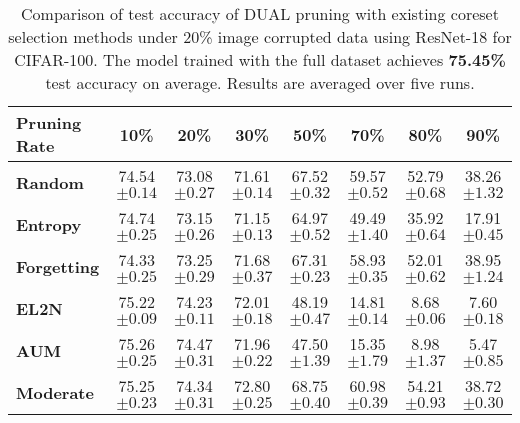 
\begin{table}[ht]
\caption{\label{tab:image_corruption_20_cifar}Comparison of test accuracy of DUAL pruning with existing coreset selection methods under 20\% image corrupted data using ResNet-18 for CIFAR-100. The model trained with the full dataset achieves \textbf{75.45\%} test accuracy on average. Results are averaged over five runs.}
\setlength{\tabcolsep}{3.1pt}
\centering
\begin{tabular}{lccccccc}
    \toprule
    \textbf{Pruning Rate} & \textbf{10\%} & \textbf{20\%} & \textbf{30\%} & \textbf{50\%} & \textbf{70\%} & \textbf{80\%} & \textbf{90\%} \\
    \midrule
    \textbf{Random} & 74.54 \scriptsize{$\pm 0.14$} & 73.08 \scriptsize{$\pm 0.27 $} & 71.61 \scriptsize{$\pm 0.14 $} & 67.52 \scriptsize{$\pm 0.32 $} & 59.57 \scriptsize{$\pm 0.52 $} & 52.79 \scriptsize{$\pm 0.68 $} & 38.26 \scriptsize{$\pm 1.32 $} \\
    
    \textbf{Entropy} & 74.74 \scriptsize{$\pm 0.25 $} & 73.15 \scriptsize{$\pm 0.26$} & 71.15 \scriptsize{$\pm 0.13 $} & 64.97 \scriptsize{$\pm 0.52 $} & 49.49 \scriptsize{$ \pm 1.40$} & 35.92 \scriptsize{$\pm 0.64 $} & 17.91 \scriptsize{$\pm 0.45 $} \\
    
    \textbf{Forgetting} & 74.33 \scriptsize{$\pm 0.25 $} & 73.25 \scriptsize{$\pm 0.29$} & 71.68 \scriptsize{$\pm 0.37 $} & 67.31 \scriptsize{$\pm 0.23$} & 58.93 \scriptsize{$\pm 0.35$} & 52.01 \scriptsize{$\pm 0.62$} & 38.95 \scriptsize{$\pm 1.24$} \\
    
    \textbf{EL2N} & 75.22 \scriptsize{$\pm 0.09 $} & 74.23 \scriptsize{$\pm 0.11 $} & 72.01 \scriptsize{$\pm 0.18 $} &48.19  \scriptsize{$\pm 0.47 $} & 14.81 \scriptsize{$\pm 0.14$} & 8.68 \scriptsize{$\pm 0.06 $} & 7.60 \scriptsize{$\pm 0.18$} \\
    
    \textbf{AUM} & 75.26 \scriptsize{$\pm 0.25$} & 74.47 \scriptsize{$\pm 0.31 $} & 71.96 \scriptsize{$\pm 0.22$} & 47.50 \scriptsize{$\pm 1.39 $} & 15.35 \scriptsize{$\pm 1.79$} & 8.98 \scriptsize{$\pm 1.37 $} & 5.47 \scriptsize{$\pm 0.85$} \\
    
    \textbf{Moderate} & 75.25 \scriptsize{$\pm 0.23 $} & 74.34 \scriptsize{$\pm 0.31 $} & 72.80 \scriptsize{$\pm 0.25 $} & 68.75 \scriptsize{$\pm 0.40 $} & 60.98 \scriptsize{$\pm 0.39 $} & 54.21 \scriptsize{$\pm 0.93 $} & 38.72 \scriptsize{$\pm 0.30 $} \\
    

\end{tabular}
\end{table}
